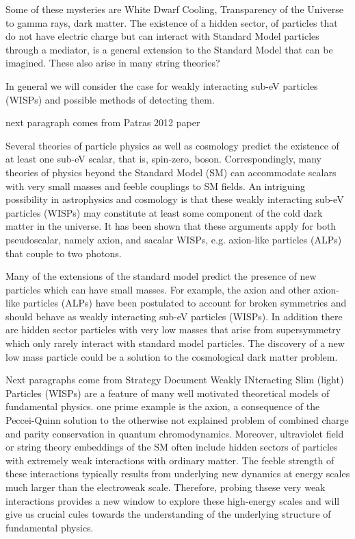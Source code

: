 \documentclass[11pt]{book}
\begin{document}
Some of these mysteries are White Dwarf Cooling, Transparency of the Universe to gamma rays, dark matter. The existence of a hidden sector, of particles that do not have electric charge but can interact with Standard Model particles through a mediator, is a general extension to the Standard Model that can be imagined. These also arise in many string theories?

In general we will consider the case for weakly interacting sub-eV particles (WISPs) and possible methods of detecting them.

{\color{blue} next paragraph comes from Patras 2012 paper}

Several theories of particle physics as well as cosmology predict the existence of at least one sub-eV scalar, that is, spin-zero, boson. Correspondingly, many theories of physics beyond the Standard Model (SM) can accommodate scalars with very small masses and feeble couplings to SM fields. An  intriguing possibility in astrophysics and cosmology is that these weakly interacting sub-eV particles (WISPs) may constitute at least some component of the cold dark matter in the universe. It has been shown that these arguments apply for both pseudoscalar, namely axion, and sacalar WISPs, e.g. axion-like particles (ALPs) that couple to two photons.

Many of the extensions of the standard model predict the presence of new particles which can have small masses. For example, the axion and other axion-like particles (ALPs) have been postulated to account for broken symmetries and should behave as weakly interacting sub-eV particles (WISPs). In addition there are hidden sector particles with very low masses that arise from supersymmetry which only rarely interact with standard model particles. The discovery of a new low mass particle  could be a solution to the cosmological dark matter problem.

{\color{blue} Next paragraphs come from Strategy Document}
Weakly INteracting Slim (light) Particles (WISPs) are a feature of many well motivated theoretical models of fundamental physics. one prime example is the axion, a consequence of the Peccei-Quinn solution to the otherwise not explained problem of combined charge and parity conservation in quantum chromodynamics. Moreover, ultraviolet field or string theory embeddings of the SM often include hidden sectors of particles with extremely weak interactions with ordinary matter. The feeble strength of these interactions typically results from underlying new dynamics at energy scales much larger than the electroweak scale. Therefore, probing thsese very weak interactions provides a new window to explore these high-energy scales and will give us crucial cules towards the understanding of the underlying structure of fundamental physics.
\end{document}
